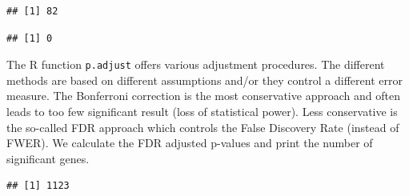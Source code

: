 \documentclass[
]{book}
\newenvironment{Shaded}{\begin{snugshade}}{\end{snugshade}}
\newcommand{\AttributeTok}[1]{\textcolor[rgb]{0.77,0.63,0.00}{#1}}
\newcommand{\FloatTok}[1]{\textcolor[rgb]{0.00,0.00,0.81}{#1}}
\newcommand{\FunctionTok}[1]{\textcolor[rgb]{0.00,0.00,0.00}{#1}}
\newcommand{\NormalTok}[1]{#1}
\newcommand{\OtherTok}[1]{\textcolor[rgb]{0.56,0.35,0.01}{#1}}
\newcommand{\SpecialCharTok}[1]{\textcolor[rgb]{0.00,0.00,0.00}{#1}}
\newcommand{\StringTok}[1]{\textcolor[rgb]{0.31,0.60,0.02}{#1}}
\begin{document}
\begin{verbatim}
## [1] 82
\end{verbatim}

\begin{Shaded}
\end{Shaded}

\begin{verbatim}
## [1] 0
\end{verbatim}

The R function \texttt{p.adjust} offers various adjustment procedures. The different methods are based on different assumptions and/or they control a different error measure. The Bonferroni correction is the most conservative approach and often leads to too few significant result (loss of statistical power). Less conservative is the so-called FDR approach which controls the False Discovery Rate (instead of FWER). We calculate the FDR adjusted p-values and print the number of significant genes.

\begin{Shaded}
\end{Shaded}

\begin{verbatim}
## [1] 1123
\end{verbatim}

\begin{Shaded}
\end{Shaded}
\end{document}
